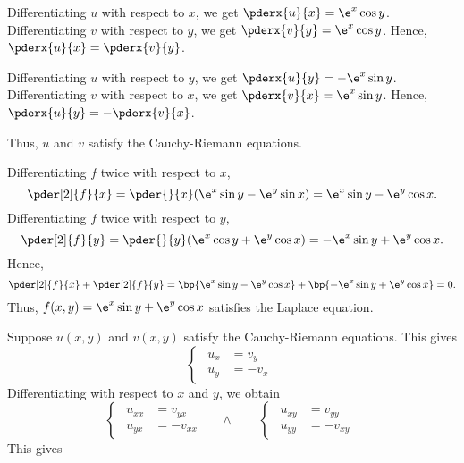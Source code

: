 \begin{solution}
    \begin{ppart}
        Differentiating $u$ with respect to $x$, we get $\pderx{u}{x} = \e^x \cos y$. Differentiating $v$ with respect to $y$, we get $\pderx{v}{y} = \e^x \cos y$. Hence, $\pderx{u}{x} = \pderx{v}{y}$.

        Differentiating $u$ with respect to $y$, we get $\pderx{u}{y} = -\e^x \sin y$. Differentiating $v$ with respect to $x$, we get $\pderx{v}{x} = \e^x \sin y$. Hence, $\pderx{u}{y} = -\pderx{v}{x}$.
        
        Thus, $u$ and $v$ satisfy the Cauchy-Riemann equations.
    \end{ppart}
    \begin{ppart}
        Differentiating $f$ twice with respect to $x$, \[\pder[2]{f}{x} = \pder{}{x} (\e^x \sin y - \e^y \sin x) = \e^x \sin y - \e^y \cos x.\] Differentiating $f$ twice with respect to $y$, \[\pder[2]{f}{y} = \pder{}{y} (\e^x \cos y + \e^y \cos x) = -\e^x \sin y + \e^y \cos x.\] Hence,\[\pder[2]{f}{x} + \pder[2]{f}{y} = \bp{\e^x \sin y - \e^y \cos x} + \bp{-\e^x \sin y + \e^y \cos x} = 0.\] Thus, $f(x, y) = \e^x \sin y + \e^y \cos x$ satisfies the Laplace equation.
    \end{ppart}
    \begin{ppart}
        Suppose $u(x, y)$ and $v(x, y)$ satisfy the Cauchy-Riemann equations. This gives
        \[\begin{cases}
            \begin{aligned}
                u_x &= v_y\\
                u_y &= -v_x
            \end{aligned}
        \end{cases}
        \]
        Differentiating with respect to $x$ and $y$, we obtain
        \[\begin{cases}
            \begin{aligned}
                u_{xx} &= v_{yx}\\
                u_{yx} &= -v_{xx}
            \end{aligned}
        \end{cases} \quad \land \qquad \begin{cases}
            \begin{aligned}
                u_{xy} &= v_{yy}\\
                u_{yy} &= -v_{xy}
            \end{aligned}
        \end{cases}\] This gives

\end{ppart}
\end{solution}
